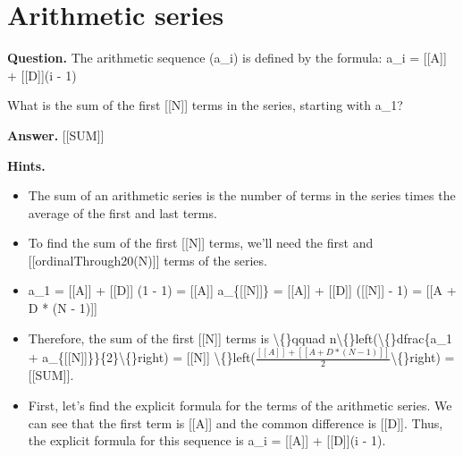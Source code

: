 \documentclass{article}
\begin{document}
\section*{Arithmetic series}
\textbf{Question.} The arithmetic sequence (a\_i) is defined by the formula:
                a\_i = [[A]] + [[D]](i - 1)
                
                    What is the sum of the first [[N]] terms in the series, starting with a\_1?

\textbf{Answer.} [[SUM]]

\textbf{Hints.}
\begin{itemize}
  \item The sum of an arithmetic series is the number of terms in the series times the average of the first and last terms.
  \item To find the sum of the first [[N]] terms,
                    we'll need the first and [[ordinalThrough20(N)]] terms of the series.
  \item a\_1 = [[A]] + [[D]] (1 - 1) = [[A]]
                    a\_\{[[N]]\} = [[A]] + [[D]] ([[N]] - 1) = [[A + D * (N - 1)]]
  \item Therefore, the sum of the first [[N]] terms is
                    \textbackslash\{\}qquad n\textbackslash\{\}left(\textbackslash\{\}dfrac\{a\_1 + a\_\{[[N]]\}\}\{2\}\textbackslash\{\}right) = [[N]] \textbackslash\{\}left($\frac{[[A]] + [[A + D * (N - 1)]]}{2}$\textbackslash\{\}right) = [[SUM]].
  \item First, let's find the explicit formula for the terms of the arithmetic series. We can see that the first term is [[A]] and the common difference is [[D]].
                    Thus, the explicit formula for this sequence is a\_i = [[A]] + [[D]](i - 1).
\end{itemize}
\end{document}
